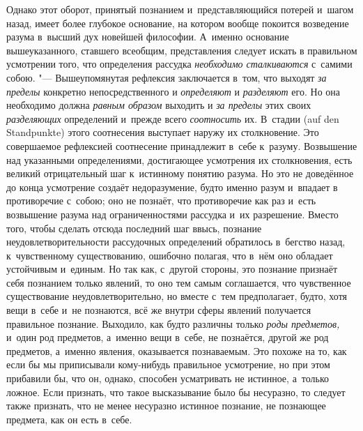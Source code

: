 Однако этот оборот, принятый познанием и~представляющийся потерей и~шагом
назад, имеет более глубокое основание, на котором вообще покоится
возведение разума в~высший дух новейшей философии. А~именно основание
вышеуказанного, ставшего всеобщим, представления следует искать в
правильном усмотрении того, что определения рассудка
{\em необходимо сталкиваются} с~самими собою. "---
Вышеупомянутая рефлексия заключается в~том, что выходят
{\em за пределы} конкретно непосредственного и
{\em определяют} и {\em разделяют}
его. Но она необходимо должна {\em равным образом}
выходить и {\em за пределы} этих своих
{\em разделяющих} определений и~прежде всего
{\em соотносить} их. В~стадии (auf den Standpunkte)
этого соотнесения выступает наружу их столкновение. Это совершаемое
рефлексией соотнесение принадлежит в~себе к~разуму. Возвышение над
указанными определениями, достигающее усмотрения их столкновения, есть
великий отрицательный шаг к~истинному понятию разума. Но это не доведённое
до конца усмотрение создаёт недоразумение, будто именно разум и~впадает в
противоречие с~собою; оно не познаёт, что противоречие как раз и~есть
возвышение разума над ограниченностями рассудка и~их разрешение. Вместо
того, чтобы сделать отсюда последний шаг ввысь, познание
неудовлетворительности рассудочных определений обратилось в~бегство назад,
к~чувственному существованию, ошибочно полагая, что в~нём оно обладает
устойчивым и~единым. Но так как, с~другой стороны, это познание признаёт
себя познанием только явлений, то оно тем самым соглашается, что
чувственное существование неудовлетворительно, но вместе с~тем
предполагает, будто, хотя вещи в~себе и~не познаются, всё же внутри сферы
явлений получается правильное познание. Выходило, как будто различны только
{\em роды предметов,} и~один род предметов, а~именно
вещи в~себе, не познаётся, другой же род предметов, а~именно явления,
оказывается познаваемым. Это похоже на то, как если бы мы приписывали
кому-нибудь правильное усмотрение, но при этом прибавили бы, что он,
однако, способен усматривать не истинное, а~только ложное. Если признать,
что такое высказывание было бы несуразно, то следует также признать, что не
менее несуразно истинное познание, не познающее предмета, как он есть в~себе.

